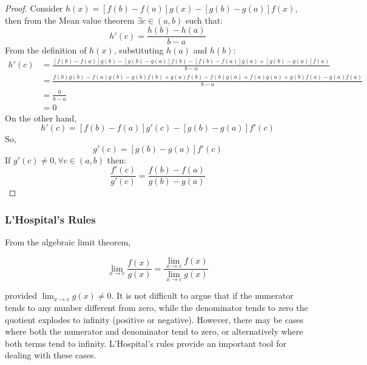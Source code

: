 \begin{proof}
    Consider $h(x) = [f(b) - f(a)]g(x) - [g(b) - g(a)]f(x)$, then from the Mean value theorem $\exists c \in (a,b)$ such that:
    \begin{equation*}
        h'(c) = \frac{h(b) - h(a)}{b-a}
    \end{equation*}
    From the definition of $h(x)$, substituting $h(a)$ and $h(b)$:
    \begin{align*}
        h'(c) &= \frac{[f(b) - f(a)]g(b) - [g(b) - g(a)]f(b) - [f(b) - f(a)]g(a) + [g(b) - g(a)]f(a)}{b-a} \\
        &= \frac{f(b)g(b) - f(a)g(b) - g(b)f(b) + g(a)f(b) - f(b)g(a) + f(a)g(a) + g(b)f(a) - g(a)f(a)}{b-a} \\
        &= \frac{0}{b-a} \\
        &= 0
    \end{align*}
    On the other hand,
    \begin{equation*}
        h'(c) = [f(b) - f(a)]g'(c) - [g(b) - g(a)]f'(c)
    \end{equation*}
    So,
    \begin{equation*}
        [f(b) - f(a)]g'(c) = [g(b) - g(a)]f'(c)
    \end{equation*}
    If $g'(c) \neq 0, \forall c \in (a,b)$ then:
    \begin{equation*}
        \frac{f'(c)}{g'(c)} = \frac{f(b) - f(a)}{g(b) - g(a)}
    \end{equation*}
\end{proof}

\subsubsection{L'Hospital's Rules}

From the algebraic limit theorem,

\begin{equation*}
    \lim \limits_{x \to c} \frac{f(x)}{g(x)} = \frac{\lim \limits_{x \to c} f(x)}{\lim \limits_{x \to c} g(x)}
\end{equation*}

provided $\lim_{x \to c} g(x) \neq 0$. It is not difficult to argue that if the numerator tends to any number different from zero, while the denominator tends to zero the quotient explodes to infinity (positive or negative). However, there may be cases where both the numerator and denominator tend to zero, or alternatively where both terms tend to infinity. L'Hospital's rules provide an important tool for dealing with these cases.

